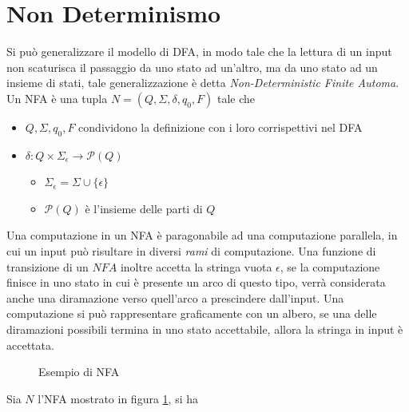 \documentclass[10pt, letterpaper]{report}
\begin{document}
\section{Non Determinismo}
Si può generalizzare il modello di DFA, in modo tale che la lettura di un input non scaturisca il passaggio da 
uno stato ad un'altro, ma da uno stato ad un insieme di stati, tale generalizzazione è 
detta \textit{Non-Deterministic Finite Automa}.\acc 
{}  Un NFA è una tupla $N=(Q,\Sigma,\delta,q_0,F)$ tale che \begin{itemize}
    \item $Q,\Sigma,q_0,F$ condividono la definizione con i loro corrispettivi nel DFA 
    \item $\delta : Q\times \Sigma_\epsilon\rightarrow\mathcal{P}(Q)$ \begin{itemize}
        \item $\Sigma_\epsilon = \Sigma \cup \{\epsilon\}$
        \item $\mathcal{P}(Q)$ è l'insieme delle parti di $Q$
    \end{itemize}
\end{itemize}
Una computazione in un NFA è paragonabile ad una computazione parallela, in cui un 
input può risultare in diversi \textit{rami} di computazione. Una funzione di transizione di un 
$NFA$ inoltre accetta la stringa vuota $\epsilon$, se la computazione finisce in uno stato in cui è 
presente un arco di questo tipo, verrà considerata anche una diramazione verso quell'arco a prescindere 
dall'input. \acc 
Una computazione si può rappresentare graficamente con un albero, se una delle diramazioni possibili termina in 
uno stato accettabile, allora la stringa in input è accettata. 
\begin{figure}[h!]
    \centering
    \caption{Esempio di NFA}
    \label{fig:NFAExample1}
\end{figure}\acc
Sia $N$ l'NFA mostrato in figura \ref{fig:NFAExample1}, si ha 
\end{document}
